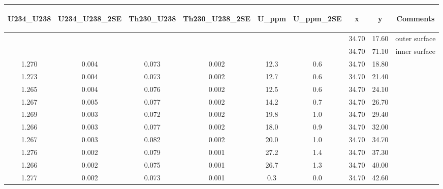 \documentclass[]{elsarticle} %
\begin{document}
\newpage

\begin{table}[ht]
\centering
\begin{tabular}{ccccccccc}
  \hline
\begin{sideways} U234\_U238 \end{sideways} & \begin{sideways} U234\_U238\_2SE \end{sideways} & \begin{sideways} Th230\_U238 \end{sideways} & \begin{sideways} Th230\_U238\_2SE \end{sideways} & \begin{sideways} U\_ppm \end{sideways} & \begin{sideways} U\_ppm\_2SE \end{sideways} & \begin{sideways} x \end{sideways} & \begin{sideways} y \end{sideways} & \begin{sideways} Comments \end{sideways} \\ 
  \hline
 &  &  &  &  &  & 34.70 & 17.60 & outer surface \\ 
   &  &  &  &  &  & 34.70 & 71.10 & inner surface \\ 
  1.270 & 0.004 & 0.073 & 0.002 & 12.3 & 0.6 & 34.70 & 18.80 &  \\ 
  1.273 & 0.004 & 0.073 & 0.002 & 12.7 & 0.6 & 34.70 & 21.40 &  \\ 
  1.265 & 0.004 & 0.076 & 0.002 & 12.5 & 0.6 & 34.70 & 24.10 &  \\ 
  1.267 & 0.005 & 0.077 & 0.002 & 14.2 & 0.7 & 34.70 & 26.70 &  \\ 
  1.269 & 0.003 & 0.072 & 0.002 & 19.8 & 1.0 & 34.70 & 29.40 &  \\ 
  1.266 & 0.003 & 0.077 & 0.002 & 18.0 & 0.9 & 34.70 & 32.00 &  \\ 
  1.267 & 0.003 & 0.082 & 0.002 & 20.0 & 1.0 & 34.70 & 34.70 &  \\ 
  1.276 & 0.002 & 0.079 & 0.001 & 27.2 & 1.4 & 34.70 & 37.30 &  \\ 
  1.266 & 0.002 & 0.075 & 0.001 & 26.7 & 1.3 & 34.70 & 40.00 &  \\ 
  1.277 & 0.002 & 0.073 & 0.001 & 0.3 & 0.0 & 34.70 & 42.60 &  \\ 

\end{tabular}
\end{table}
\end{document}
